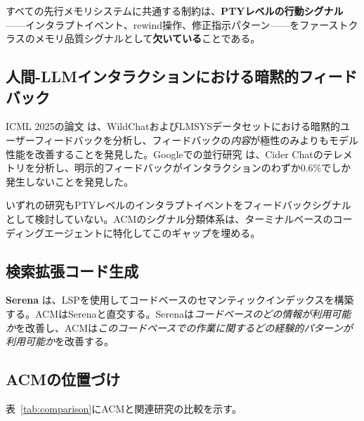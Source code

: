 \documentclass[conference]{IEEEtran}
\begin{document}
すべての先行メモリシステムに共通する制約は、\textbf{PTYレベルの行動シグナル}——インタラプトイベント、rewind操作、修正指示パターン——をファーストクラスのメモリ品質シグナルとして\textbf{欠いている}ことである。

\subsection{人間-LLMインタラクションにおける暗黙的フィードバック}

ICML 2025の論文 \cite{Liu2025ImplicitFeedback}は、WildChatおよびLMSYSデータセットにおける暗黙的ユーザーフィードバックを分析し、フィードバックの\emph{内容}が極性のみよりもモデル性能を改善することを発見した。Googleでの並行研究 \cite{Nam2025CiderChat}は、Cider Chatのテレメトリを分析し、明示的フィードバックがインタラクションのわずか0.6\%でしか発生しないことを発見した。

いずれの研究もPTYレベルのインタラプトイベントをフィードバックシグナルとして検討していない。ACMのシグナル分類体系は、ターミナルベースのコーディングエージェントに特化してこのギャップを埋める。

\subsection{検索拡張コード生成}

\textbf{Serena} \cite{OraiosAI2025Serena}は、LSPを使用してコードベースのセマンティックインデックスを構築する。ACMはSerenaと直交する。Serenaは\emph{コードベースのどの情報が利用可能か}を改善し、ACMは\emph{このコードベースでの作業に関するどの経験的パターンが利用可能か}を改善する。

\subsection{ACMの位置づけ}

表~\ref{tab:comparison}にACMと関連研究の比較を示す。
\end{document}
